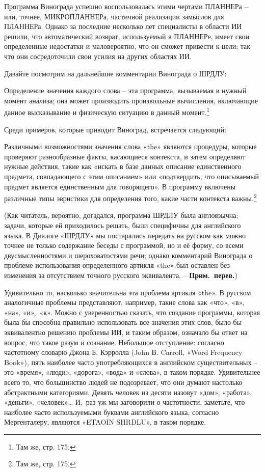 \documentclass[../main.tex]{subfiles}
\begin{document}
Программа Винограда успешно воспользовалась этими чертами ПЛАННЕРа \--- или, точнее, МИКРОПЛАННЕРа, частичной реализации замыслов для ПЛАННЕРа. Однако за последние несколько лет специалисты в области ИИ решили, что автоматический возврат, используемый в ПЛАННЕРе, имеет свои определенные недостатки и маловероятно, что он сможет привести к цели; так что они сосредоточили свои усилия на других областях ИИ.

Давайте посмотрим на дальнейшие комментарии Винограда о ШРДЛУ:

Определение значения каждого слова \--- эта программа, вызываемая в нужный момент анализа; она может производить произвольные вычисления, включающие данное высказывание и физическую ситуацию в данный момент.\footnote{Там же, стр. 175.}

Среди примеров, которые приводит Виноград, встречается следующий:

Различными возможностями значения слова «the» являются процедуры, которые проверяют разнообразные факты, касающиеся контекста, и затем определяют нужные действия, такие как «искать в базе данных описание единственного предмета, совпадающего с этим описанием» или «подтвердить, что описываемый предмет является единственным для говорящего». В программу включены различные типы эвристики для определения того, какие части контекста важны.\footnote{Там же, стр. 175.}

(Как читатель, вероятно, догадался, программа ШРДЛУ была англоязычна; задачи, которые ей приходилось решать, были специфичны для английского языка. В Диалоге «ШРДЛУ» мы постарались передать на русском как можно точнее не только содержание беседы с программой, но и её форму, со всеми двусмысленностями и шероховатостями речи; однако комментарий Винограда о проблеме использования определенного артикля «the» был оставлен без изменения за отсутствием точного русского эквивалента. \--- \textbf{Прим.\ перев.})

Удивительно то, насколько значительна эта проблема артикля «the». В русском аналогичные проблемы представляют, например, такие слова как «что», «в», «на», «и»,~«к». Можно с уверенностью сказать, что создание программы, которая была бы способна правильно использовать все значения этих слов, было бы эквивалентно решению проблемы ИИ, и таким образом, означало бы ответ на вопрос, что такое разум и сознание. Небольшое отступление: согласно частотному словарю Джона Б. Кэрролла (John В. Carroll, «Word Frequency Book»), пять наиболее часто употребляющихся в английском существительных \--- это «время», «люди», «дорога», «вода» и «слова», в таком порядке. Удивительнее всего то, что большинство людей не подозревает, что они думают настолько абстрактными категориями. Девять человек из десяти назовут «дом», «работа», «деньги», «человек»\ldots{} И,~раз уж мы заговорили о частотности, заметьте, что наиболее часто используемыми буквами английского языка, согласно Мергенталеру, являются «ETAOIN SHRDLU», в таком порядке.
\end{document}
